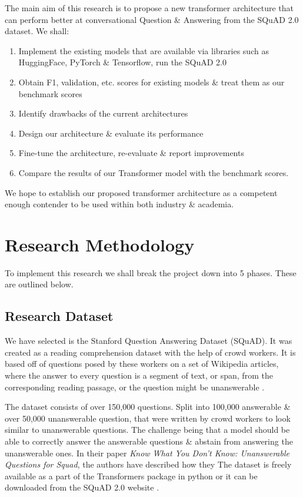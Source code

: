 \documentclass[11pt]{article}
\begin{document}
	The main aim of this research is to propose a new transformer architecture that can perform better at conversational Question \& Answering from the SQuAD 2.0 dataset\citep{dataset}.
	We shall:
	\begin{enumerate}
		\item Implement the existing models that are available via libraries such as HuggingFace\citep{hfTransformers}, PyTorch \& Tensorflow, run the SQuAD 2.0\citep{dataset}
		\item Obtain F1, validation, etc. scores for existing models \& treat them as our benchmark scores
		\item Identify drawbacks of the current architectures
		\item Design our architecture \& evaluate its performance
		\item Fine-tune the architecture, re-evaluate \& report improvements
		\item Compare the results of our Transformer model with the benchmark scores.
	\end{enumerate}
	We hope to establish our proposed transformer architecture as a competent enough contender to be used within both industry \& academia.
	\section{Research Methodology}\label{researchMeth}
	
	To implement this research we shall break the project down into 5 phases. These are outlined below.
	\subsection{Research Dataset}\label{datas}
	
	We have selected is the Stanford Question Answering Dataset (SQuAD). It was created as a reading comprehension dataset with the help of crowd workers. It is based off of questions posed by these workers on a set of Wikipedia articles, where the answer to every question is a segment of text, or span, from the corresponding reading passage, or the question might be unanswerable \citep{dataset}.
	
	The dataset consists of over 150,000 questions. Split into 100,000 answerable \& over 50,000 unanswerable question, that were written by crowd workers to look similar to unanswerable questions. The challenge being that a model should be able to correctly answer the answerable questions \& abstain from answering the unanswerable ones. In their paper \textit{Know What You Don't Know: Unanswerable Questions for Squad}, \cite{dataset} the authors have described how they 
	The dataset is freely available as a part of the Transformers package in python or it can be downloaded from the SQuAD 2.0 website \citep{squad}.
	
\end{document}

